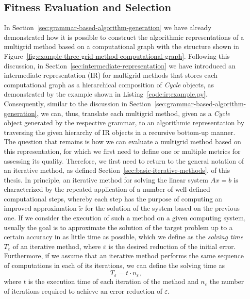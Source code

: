 \subsection{Fitness Evaluation and Selection}
In Section~\ref{sec:grammar-based-algorithm-generation} we have already demonstrated how it is possible to construct the algorithmic representations of a multigrid method based on a computational graph with the structure shown in Figure~\ref{fig:example-three-grid-method-computational-graph}.
Following this discussion, in Section~\ref{sec:intermediate-representation} we have introduced an intermediate representation (IR) for multigrid methods that stores each computational graph as a hierarchical composition of \emph{Cycle} objects, as demonstrated by the example shown in Listing~\ref{code:ir:example.py}. 
Consequently, similar to the discussion in Section~\ref{sec:grammar-based-algorithm-generation}, we can, thus, translate each multigrid method, given as a \emph{Cycle} object generated by the respective grammar, to an algorithmic representation by traversing the given hierarchy of IR objects in a recursive bottom-up manner.
The question that remains is how we can evaluate a multigrid method based on this representation, for which we first need to define one or multiple metrics for assessing its quality.
Therefore, we first need to return to the general notation of an iterative method, as defined Section~\ref{sec:basic-iterative-methods}, of this thesis.
In principle, an iterative method for solving the linear system $A x = b$ is characterized by the repeated application of a number of well-defined computational steps, whereby each step has the purpose of computing an improved approximation $\tilde{x}$ for the solution of the system based on the previous one.
If we consider the execution of such a method on a given computing system, usually the goal is to approximate the solution of the target problem up to a certain accuracy in as little time as possible, which we define as the \emph{solving time} $T_{\varepsilon}$ of an iterative method, where $\varepsilon$ is the desired reduction of the initial error. 
Furthermore, if we assume that an iterative method performs the same sequence of computations in each of its iterations, we can define the solving time as
\begin{equation}
	T_{\varepsilon} = t \cdot n_{\varepsilon},
	\label{eq:solving-time-basic}
\end{equation} 
where $t$ is the execution time of each iteration of the method and $n_{\varepsilon}$ the number of iterations required to achieve an error reduction of $\varepsilon$.
